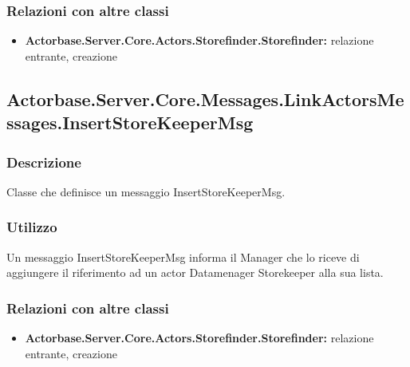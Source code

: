 \documentclass[a4paper]{article}
\begin{document}
			\subsubsection{Relazioni con altre classi}
			\begin{itemize}
				\item \textbf{Actorbase.Server.Core.Actors.Storefinder.Storefinder:} relazione entrante, creazione
			\end{itemize}

			\subsection{Actorbase.Server.Core.Messages.LinkActorsMessages.InsertStoreKeeperMsg}
			\subsubsection{Descrizione}
				Classe che definisce un messaggio InsertStoreKeeperMsg.
			\subsubsection{Utilizzo}
				Un messaggio InsertStoreKeeperMsg informa il Manager che lo riceve di aggiungere il riferimento ad un actor Datamenager Storekeeper alla sua lista.
			\subsubsection{Relazioni con altre classi}
			\begin{itemize}
				\item \textbf{Actorbase.Server.Core.Actors.Storefinder.Storefinder:} relazione entrante, creazione
			\end{itemize}
			
\end{document}
